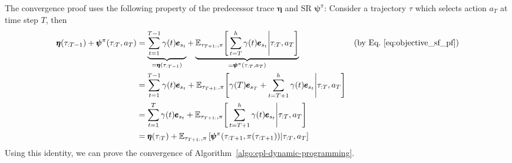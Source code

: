 \documentclass{article}
\theoremstyle{plain}
\theoremstyle{definition}
\theoremstyle{remark}
\begin{document}
The convergence proof uses the following property of the predecessor trace $\pmb{\eta}$ and SR $\pmb{\psi}^\pi$:
Consider a trajectory $\tau$ which selects action $a_T$ at time step $T$,
then
\begin{align}
    \pmb{\eta}(\tau_{:T-1}) + \pmb{\psi}^\pi( \tau_{:T},a_T ) &= \underbrace{\sum_{t=1}^{T-1} \gamma(t) \pmb{e}_{s_t}}_{=\pmb{\eta}(\tau_{:T-1})} + \underbrace{\mathbb{E}_{\tau_{T+1:}, \pi} \Bigg[  \sum_{t=T}^h\gamma(t) \pmb{e}_{s_t} \Bigg| \tau_{:T},a_T \Bigg]}_{=\pmb{\psi}^\pi( \tau_{:T}, a_T )} &\text{(by Eq.~\eqref{eq:objective_sf_pf})} \nonumber \\
    &= \sum_{t=1}^{T-1} \gamma(t) \pmb{e}_{s_t} + \mathbb{E}_{\tau_{T+1:}, \pi} \Bigg[ \gamma(T)\pmb{e}_{s_T} + \sum_{t=T+1}^h\gamma(t) \pmb{e}_{s_t} \Bigg| \tau_{:T},a_T \Bigg] \\
    &= \sum_{t=1}^{T} \gamma(t) \pmb{e}_{s_t} + \mathbb{E}_{\tau_{T+1:}, \pi} \Bigg[ \sum_{t=T+1}^h\gamma(t) \pmb{e}_{s_t} \Bigg| \tau_{:T},a_T \Bigg] \\
    &= \pmb{\eta}(\tau_{:T}) + \mathbb{E}_{\tau_{T+1:}, \pi} \left[ \pmb{\psi}^\pi( \tau_{:T+1}, \pi(\tau_{:T+1}) ) \middle| \tau_{:T},a_T \right] \label{eq:eta-psi-splitting}
\end{align}
Using this identity, we can prove the convergence of Algorithm~\ref{algo:epl-dynamic-programming}.
\end{document}
